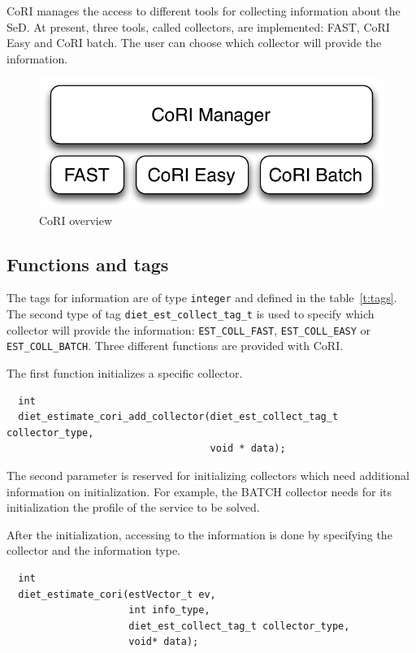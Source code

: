 CoRI manages the access to different tools for collecting information
about the SeD. At present, three tools, called collectors, are
implemented: FAST, CoRI Easy and CoRI batch. The user can choose which
collector will provide the information.

\begin{figure}[h]
  \begin{center}
    \includegraphics[scale=0.5]{fig/overviewCori}
    \caption{CoRI overview}
    \label{fig:cori-overview}
  \end{center}
\end{figure}

\subsection{Functions and tags}
The tags for information are of type \texttt{integer} and defined in
the table~\ref{t:tags}. The second type of tag
\texttt{diet\_est\_collect\_tag\_t} is used to specify which collector
will provide the information: \texttt{EST\_COLL\_FAST},
\texttt{EST\_COLL\_EASY} or \texttt{EST\_COLL\_BATCH}. Three different
functions are provided with CoRI.

The first function initializes a specific collector.

\footnotesize
\begin{verbatim}
  int
  diet_estimate_cori_add_collector(diet_est_collect_tag_t collector_type,
                                   void * data);
\end{verbatim}
\normalsize The second parameter is reserved for initializing
collectors which need additional information on initialization. For
example, the BATCH collector needs for its initialization the profile
of the service to be solved.

After the initialization, accessing to the information is done by
specifying the collector and the information type. 
\footnotesize
\begin{verbatim}
  int
  diet_estimate_cori(estVector_t ev,
                     int info_type,
                     diet_est_collect_tag_t collector_type,
                     void* data);
\end{verbatim}
\normalsize

